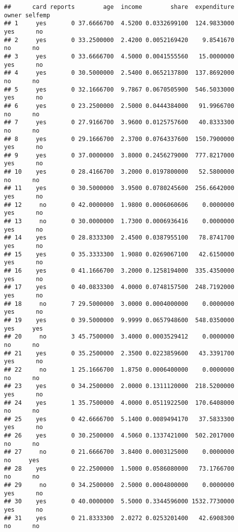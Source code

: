 \documentclass[]{article}
\begin{document}
\begin{verbatim}
##      card reports        age  income        share  expenditure owner selfemp
## 1     yes       0 37.6666700  4.5200 0.0332699100  124.9833000   yes      no
## 2     yes       0 33.2500000  2.4200 0.0052169420    9.8541670    no      no
## 3     yes       0 33.6666700  4.5000 0.0041555560   15.0000000   yes      no
## 4     yes       0 30.5000000  2.5400 0.0652137800  137.8692000    no      no
## 5     yes       0 32.1666700  9.7867 0.0670505900  546.5033000   yes      no
## 6     yes       0 23.2500000  2.5000 0.0444384000   91.9966700    no      no
## 7     yes       0 27.9166700  3.9600 0.0125757600   40.8333300    no      no
## 8     yes       0 29.1666700  2.3700 0.0764337600  150.7900000   yes      no
## 9     yes       0 37.0000000  3.8000 0.2456279000  777.8217000   yes      no
## 10    yes       0 28.4166700  3.2000 0.0197800000   52.5800000    no      no
## 11    yes       0 30.5000000  3.9500 0.0780245600  256.6642000   yes      no
## 12     no       0 42.0000000  1.9800 0.0006060606    0.0000000   yes      no
## 13     no       0 30.0000000  1.7300 0.0006936416    0.0000000   yes      no
## 14    yes       0 28.8333300  2.4500 0.0387955100   78.8741700   yes      no
## 15    yes       0 35.3333300  1.9080 0.0269067100   42.6150000   yes      no
## 16    yes       0 41.1666700  3.2000 0.1258194000  335.4350000   yes      no
## 17    yes       0 40.0833300  4.0000 0.0748157500  248.7192000   yes      no
## 18     no       7 29.5000000  3.0000 0.0004000000    0.0000000   yes      no
## 19    yes       0 39.5000000  9.9999 0.0657948600  548.0350000   yes     yes
## 20     no       3 45.7500000  3.4000 0.0003529412    0.0000000    no      no
## 21    yes       0 35.2500000  2.3500 0.0223859600   43.3391700   yes      no
## 22     no       1 25.1666700  1.8750 0.0006400000    0.0000000    no      no
## 23    yes       0 34.2500000  2.0000 0.1311120000  218.5200000   yes      no
## 24    yes       1 35.7500000  4.0000 0.0511922500  170.6408000    no      no
## 25    yes       0 42.6666700  5.1400 0.0089494170   37.5833300   yes      no
## 26    yes       0 30.2500000  4.5060 0.1337421000  502.2017000    no      no
## 27     no       0 21.6666700  3.8400 0.0003125000    0.0000000    no     yes
## 28    yes       0 22.2500000  1.5000 0.0586080000   73.1766700    no      no
## 29     no       0 34.2500000  2.5000 0.0004800000    0.0000000   yes      no
## 30    yes       0 40.0000000  5.5000 0.3344596000 1532.7730000   yes      no
## 31    yes       0 21.8333300  2.0272 0.0253201400   42.6908300    no      no

\end{verbatim}
\end{document}
